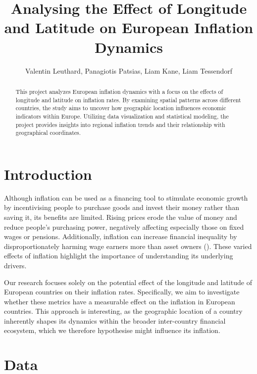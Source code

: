 \documentclass{article}
\title{Analysing the Effect of Longitude and Latitude on European Inflation Dynamics}
\author{Valentin Leuthard, Panagiotis Patsias, Liam Kane, Liam Tessendorf}
\begin{document}
    \maketitle
    \vspace{\baselineskip}
    \vspace{\baselineskip}    
    \vspace{\baselineskip}
    \begin{abstract}
    This project analyzes European inflation dynamics with a focus on the effects of longitude and latitude on inflation rates. By examining spatial patterns across different countries, the study aims to uncover how geographic location influences economic indicators within Europe. Utilizing data visualization and statistical modeling, the project provides insights into regional inflation trends and their relationship with geographical coordinates.
    \end{abstract}
    \newpage

    \section{Introduction}

    Although inflation can be used as a financing tool to stimulate economic growth by incentivising people to purchase goods and invest their money rather than saving it, its benefits are limited. Rising prices erode the value of money and reduce people's purchasing power, negatively affecting especially those on fixed wages or pensions. Additionally, inflation can increase financial inequality by disproportionately harming wage earners more than asset owners (\cite{TheEffectofInflationonEconomicDevelopment}). These varied effects of inflation highlight the importance of understanding its underlying drivers.

    Our research focuses solely on the potential effect of the longitude and latitude of European countries on their inflation rates. Specifically, we aim to investigate whether these metrics have a measurable effect on the inflation in European countries. This approach is interesting, as the geographic location of a country inherently shapes its dynamics within the broader inter-country financial ecosystem, which we therefore hypothesise might influence its inflation.

    \section{Data}
    
\end{document}
